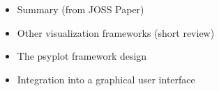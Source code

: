 

\label{chp:psyplot}


\begin{itemize}
	\item Summary (from JOSS Paper)
	\item Other visualization frameworks (short review)
	\item The psyplot framework design
	\item Integration into a graphical user interface
\end{itemize}